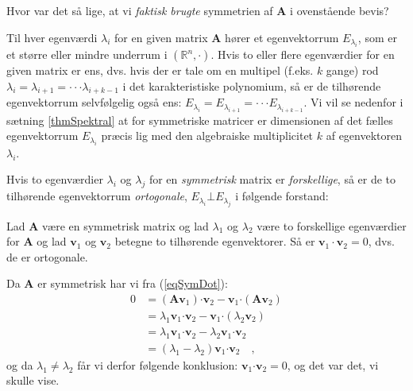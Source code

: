 \begin{exercise}
Hvor var det så lige, at vi {\em{faktisk brugte}} symmetrien af $\mathbf{A}$ i ovenstående bevis?
\end{exercise}

\begin{think}
Til hver egenværdi $\lambda_{i}$ for en given matrix $\mathbf{A}$ hører et egenvektorrum $E_{\lambda_{i}}$, som er et større eller mindre underrum i $(\mathbb{R}^{n}, \bm{\cdot})$. Hvis to eller flere egenværdier for en given matrix er ens, dvs. hvis der er tale om en multipel (f.eks. $k$ gange) rod $\lambda_{i} = \lambda_{i+1} = \cdot \cdot \cdot \lambda_{i+k-1}$ i det karakteristiske polynomium, så er de tilhørende egenvektorrum selvfølgelig også ens: $E_{\lambda_{i}} = E_{\lambda_{i+1}} = \cdot \cdot \cdot E_{\lambda_{i+k-1}}$. Vi vil se nedenfor i sætning \ref{thmSpektral} at for symmetriske matricer er dimensionen af det fælles egenvektorrum $E_{\lambda_{i}}$ præcis lig med den algebraiske multiplicitet $k$ af egenvektoren $\lambda_{i}$.
\end{think}

Hvis to egenværdier $\lambda_{i}$ og $\lambda_{j}$ for en {\em{symmetrisk}} matrix er {\em{forskellige}}, så er de to tilhørende egenvektorrum {\em{ortogonale}}, $E_{\lambda_{i}} \bot E_{\lambda_{j}}$ i følgende forstand:

\begin{theorem} \label{thmForskEgenval}
Lad $\mathbf{A}$ være en symmetrisk matrix og lad $\lambda_{1}$ og $\lambda_{2}$ være to forskellige egenværdier for
$\mathbf{A}$ og lad $\mathbf{v}_{1}$ og $\mathbf{v}_{2}$ betegne to tilhørende egenvektorer. Så er $\mathbf{v}_{1} \cdot \mathbf{v}_{2} = 0$, dvs. de er ortogonale.
\end{theorem}
\begin{bevis}
Da $\mathbf{A}$ er symmetrisk har vi fra (\ref{eqSymDot}):
\begin{equation}
\begin{aligned}
0 &= \left(\mathbf{A}\mathbf{v}_{1}\right) {\bm{\cdot}} \mathbf{v}_{2} - \mathbf{v}_{1}{\bm{\cdot}} \left(\mathbf{A}\mathbf{v}_{2}\right) \\
&= \lambda_{1}\mathbf{v}_{1}{\bm{\cdot}}  \mathbf{v}_{2} - \mathbf{v}_{1}{\bm{\cdot}}  \left(\lambda_{2}\mathbf{v}_{2}\right) \\
&= \lambda_{1}\mathbf{v}_{1}{\bm{\cdot}}  \mathbf{v}_{2} - \lambda_{2}\mathbf{v}_{1}{\bm{\cdot}}  \mathbf{v}_{2} \\
&= \left(\lambda_{1} - \lambda_{2}\right)\mathbf{v}_{1}{\bm{\cdot}} \mathbf{v}_{2} \quad ,
\end{aligned}
\end{equation}
og da $\lambda_{1} \neq \lambda_{2}$ får vi derfor følgende konklusion: $\mathbf{v}_{1}{\bm{\cdot}} \mathbf{v}_{2} = 0$, og det var det, vi skulle vise.
\end{bevis}


